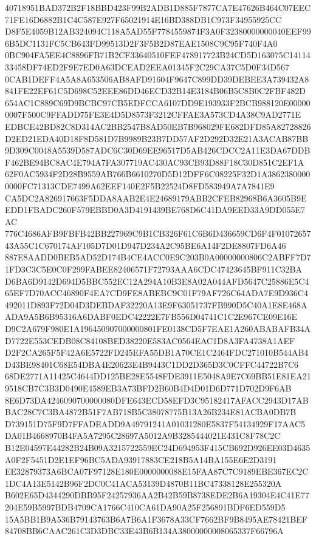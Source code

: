 \documentclass[UTF8,fontset=fandol,zihao=-4,a4paper]{ctexart}
\begin{document}
{{40718951BAD372B2F18BBD423F99B2ADB1D885F7877CA7E47626B464C07EEC71FE16D6882B1C4C587E927F65021914E16BD388DB1C973F34955925CC
D8F5E4059B12AB324094C118A5AD55F7784559874F3A0F32380000000040EEF996B5DC1131FC5CB643FD99513D2F3F5B2D87EAE1508C9C95F740F4A0
0BC904FA5EE4C8896FB71B2CF33640510FEF478917723B24CD5D163075C1411433458DF74ED2F9E7ED0A63DCEAD2EEA01345F2C29CA37C5D0F34D567
0CAB1DEFF4A5A8A653506AB8AFD91604F9647C899DD39DEBEE3A739432A8841FE22EF61C5D698C52EEE86DD46ECD32B14E3184B06B5C8B0C2FBF482D
654AC1C889C69D9BCBC97CB5EDFCCA6107DD9E193933F2BCB988120E000000007F500C9FFADD75FE3E4D5D8573F3212CFFAE3A573CD4A38C9AD2771E
EDBCE42BD82C8D314AC2BB2547B8AD50EB7B968029FE682DFD85A82728826D2ED21EDA40D18F8D581D7B9989B23B7DD57AF2D292D32E21A3ACAB87BB
9D309C0048A5539D587ADC6C30D69EE96517D5AB426CDCC2A11E3DA67DDBF462BE94BC8AC4E794A7FA307719AC430AC93CB93D88F18C30D851C2EF1A
62F0AC5934F2D28B9559AB766B6610270D5D12DFF6C08225F32D1A38623800000000FC71313CDE7499A62EEF140E2F5B22524D8FD583949A7A7841E9
CA5DC2A826917663F5DDA8AAB2E4E24689179ABB2CFEB82968B6A3605B9EEDD1FBADC260F579EBBD0A3D4191439BE768D6C41DA9EED33A9DD055E7AC
776C4686AFB9FBFB42BB227969C9B1CB326F61C6B6D436659CD6F4F0107265743A55C1C670174AF105D7D01D947D234A2C95BE6A14F2DE8807FD6A46
887E8AADD0BEB5AD52D174B4CE4ACC0E9C203B0A00000000806C2ABFF7D71FD3C3C5E0C0F299FABEE82406571F72793AAA6CDC47423645BF911C32BA
D6BA6D9142D694D5BBC552EC12A294A10B3E8A02A044AFD5647C25886E5C465EF7D70ACC46890F4EA7CD9FE8ABEBC9C01F79AF726C64ADA7E9D936C4
492011D893F72D04D3DEBDAF32220A13E9F63051737FB990D5C40A1E8E468AADA9A5B6B95316A6DABF0EDC42222E7FB556D04741C1C2E967CE09E16E
D9C2A679F980E1A196450907000000801FE0138CD5F7EAE1A260ABABAFB34AD7722E553CEDB08C84108BED38220E583AC0564EAC1D8A3FA4738A1AEF
D2F2CA265F5F42A6E5722FD245EFA55DB1A70CE1C2464FDC271010B544AB4D43BE98401C68E54DBA4E20623E4B9443C1DD2D365D3C0CFFC44722B7C6
68DE2771A11425C4644DD125BE28E5548FDE3911E5048A9E7C69BB51E81EA219518CB7C3B3D0490E4589EB3A73BFD2B60B4D4D01D6D771D702D9F6AB
8E6D73DA4246090700000080DFE643ECD58EFD3C95182417AFACC2943D17ABBAC28C7C3BA4872B51F7AB718B5C38078775B13A26B234E81ACBA0DB7B
D739151D75F9D7FFADEADD9A49791241A01031280E5837F54134929F17AAC5DA01B4668970B4FA5A7295C28697A5012A9B3285444021E431C8F78C2C
B12E04597E44282B24B09A3215722559EC24D694953F415CB692D926EE03D4635A0F2F5451D2E1EF96BC5ADA93917883CE218B5A14BA155E6E2D3191
EE32879373A6BCA07F97128E180E0000000088E15FAA87C7C9189EBE367EC2C1DC4A13E5142B96F2DC0C41ACA53139D4870B11BC47338128E255320A
B602E65D4344290DBB95F24257936AA2B42B59B8738EDE2B6A19304E4C41E77204E59B5997BDB4709CA1766C410CA61DA90A25F256891BDF6ED559D5
15A5BB1B9A536B79143763B6A7B6A1F3678A33CF7662BF9B8495AE78421BEF84708BB6CAAC261C3D3DBC33E43B6B134A38000000008065337F66796A
}}
\end{document}
